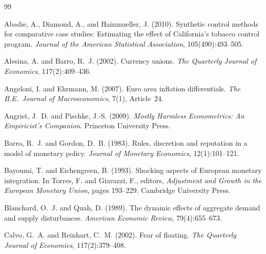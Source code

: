 \documentclass[11pt,a4paper]{article}
\begin{document}
\begingroup
\renewcommand{\section}[2]{}  %
\begin{thebibliography}{99}
\small

Abadie, A., Diamond, A., and Hainmueller, J. (2010).
\newblock Synthetic control methods for comparative case studies: Estimating the
  effect of California's tobacco control program.
\newblock \emph{Journal of the American Statistical Association},
  105(490):493--505.

Alesina, A. and Barro, R.~J. (2002).
\newblock Currency unions.
\newblock \emph{The Quarterly Journal of Economics}, 117(2):409--436.

Angeloni, I. and Ehrmann, M. (2007).
\newblock Euro area inflation differentials.
\newblock \emph{The B.E.\ Journal of Macroeconomics}, 7(1), Article~24.

Angrist, J.~D. and Pischke, J.-S. (2009).
\newblock \emph{Mostly Harmless Econometrics: An Empiricist's Companion}.
\newblock Princeton University Press.

Barro, R.~J. and Gordon, D.~B. (1983).
\newblock Rules, discretion and reputation in a model of monetary policy.
\newblock \emph{Journal of Monetary Economics}, 12(1):101--121.

Bayoumi, T. and Eichengreen, B. (1993).
\newblock Shocking aspects of European monetary integration.
\newblock In Torres, F. and Giavazzi, F., editors, \emph{Adjustment and Growth
  in the European Monetary Union}, pages 193--229. Cambridge University Press.

Blanchard, O.~J. and Quah, D. (1989).
\newblock The dynamic effects of aggregate demand and supply disturbances.
\newblock \emph{American Economic Review}, 79(4):655--673.

Calvo, G.~A. and Reinhart, C.~M. (2002).
\newblock Fear of floating.
\newblock \emph{The Quarterly Journal of Economics}, 117(2):379--408.


\end{thebibliography}
\end{document}
